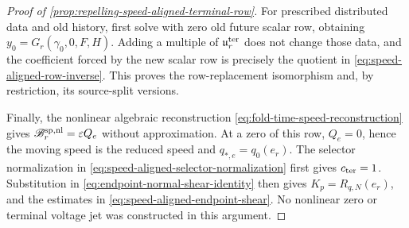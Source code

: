 \begin{proof}[Proof of
\cref{prop:repelling-speed-aligned-terminal-row}]
For prescribed distributed data and old history, first solve with zero old
future scalar row, obtaining
\(
y_0=G_r(\gamma_0,0,F,H)
\).
Adding a multiple of
\(
\mathfrak u_r^{\rm ter}
\)
does not change those data, and the coefficient forced by the new scalar
row is precisely the quotient in
\cref{eq:speed-aligned-row-inverse}.  This proves the row-replacement
isomorphism and, by restriction, its source-split versions.

Finally, the nonlinear algebraic reconstruction
\cref{eq:fold-time-speed-reconstruction} gives
\(
\mathscr B_r^{\rm sp,nl}=\varepsilon Q_e
\)
without approximation.  At a zero of this row,
\(
Q_e=0
\), hence the moving speed is the reduced speed and
\(
q_{*,e}=q_0(e_r)
\).
The selector normalization in
\cref{eq:speed-aligned-selector-normalization} first gives
\(c_{\rm ter}=1\).  Substitution in
\cref{eq:endpoint-normal-shear-identity} then gives
\(
K_p=R_{q,N}(e_r)
\), and the estimates in
\cref{eq:speed-aligned-endpoint-shear}.  No nonlinear zero or terminal
voltage jet was constructed in this argument.
\end{proof}

